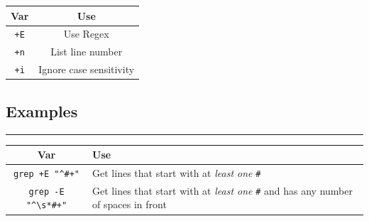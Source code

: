 \documentclass{article}
\theoremstyle{mytheoremstyle}
\theoremstyle{mytheoremstyle}
\theoremstyle{myproblemstyle}
\theoremstyle{myproblemstyle}
\begin{document}
    \begin{center}
    \begin{tabular}{|c|c|}
    \hline
    Var & Use \\
    \hline
    \verb|+E| & Use Regex \\
    \hline
    \verb|+n| & List line number \\
    \hline
    \verb|+i| & Ignore case sensitivity \\
    \hline
    \end{tabular}
    \end{center}
    
    \subsection{Examples}
    \hrule
    \vspace{.5cm}
    
    \begin{center}
    \begin{tabular}{|c|p{8cm}|}
    \hline
    Var & Use \\
    \hline
      \verb|grep +E "^#+"| & Get lines that start with at \textit{least one} \verb|#| \\
    \hline
      \verb|grep -E "^\s*#+"| & Get lines that start with at \textit{least one} \verb|#| and has any number of spaces in front  \\
    \hline
    \end{tabular}
    \end{center}
    
    
    
\pagebreak
\tikzifexternalizing{}{%
  \printglossaries
}
\end{document}
